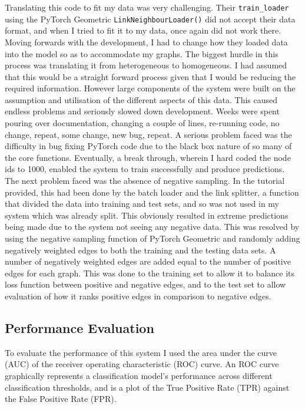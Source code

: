 \documentclass{l4proj}
\begin{document}
Translating this code to fit my data was very challenging. Their \texttt{train\_loader} using the PyTorch Geometric \texttt{LinkNeighbourLoader()} did not accept their data format, and when I tried to fit it to my data, once again did not work there. Moving forwards with the development, I had to change how they loaded data into the model so as to accommodate my graphs. The biggest hurdle in this process was translating it from heterogeneous to homogeneous. I had assumed that this would be a straight forward process given that I would be reducing the required information. However large components of the system were built on the assumption and utilisation of the different aspects of this data. This caused endless problems and seriously slowed down development. Weeks were spent pouring over documentation, changing a couple of lines, re-running code, no change, repeat, some change, new bug, repeat. A serious problem faced was the difficulty in bug fixing PyTorch code due to the black box nature of so many of the core functions. Eventually, a break through, wherein I hard coded the node ids to 1000, enabled the system to train successfully and produce predictions. \\

The next problem faced was the absence of negative sampling. In the tutorial provided, this had been done by the batch loader and the link splitter, a function that divided the data into training and test sets, and so was not used in my system which was already split. This obviously resulted in extreme predictions being made due to the system not seeing any negative data. This was resolved by using the negative sampling function of PyTorch Geometric and randomly adding negatively weighted edges to both the training and the testing data sets. A number of negatively weighted edges are added equal to the number of positive edges for each graph. This was done to the training set to allow it to balance its loss function between positive and negative edges, and to the test set to allow evaluation of how it ranks positive edges in comparison to negative edges. \\

\subsection{Performance Evaluation}

To evaluate the performance of this system I used the area under the curve (AUC) of the receiver operating characteristic (ROC) curve. An ROC curve graphically represents a classification model's performance across different classification thresholds, and is a plot of the True Positive Rate (TPR) against the False Positive Rate (FPR). \\
\end{document}
